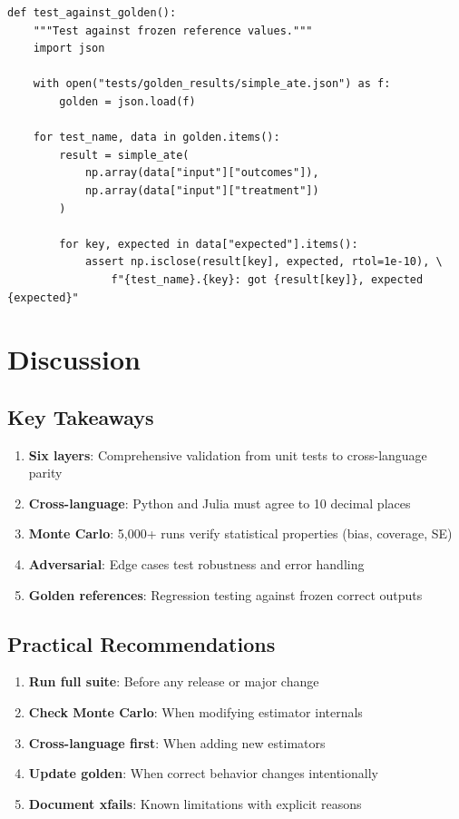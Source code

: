 \begin{verbatim}
def test_against_golden():
    """Test against frozen reference values."""
    import json

    with open("tests/golden_results/simple_ate.json") as f:
        golden = json.load(f)

    for test_name, data in golden.items():
        result = simple_ate(
            np.array(data["input"]["outcomes"]),
            np.array(data["input"]["treatment"])
        )

        for key, expected in data["expected"].items():
            assert np.isclose(result[key], expected, rtol=1e-10), \
                f"{test_name}.{key}: got {result[key]}, expected {expected}"
\end{verbatim}


\section{Discussion}

\subsection{Key Takeaways}

\begin{enumerate}
\item \textbf{Six layers}: Comprehensive validation from unit tests to cross-language parity
\item \textbf{Cross-language}: Python and Julia must agree to 10 decimal places
\item \textbf{Monte Carlo}: 5,000+ runs verify statistical properties (bias, coverage, SE)
\item \textbf{Adversarial}: Edge cases test robustness and error handling
\item \textbf{Golden references}: Regression testing against frozen correct outputs
\end{enumerate}

\subsection{Practical Recommendations}

\begin{enumerate}
\item \textbf{Run full suite}: Before any release or major change
\item \textbf{Check Monte Carlo}: When modifying estimator internals
\item \textbf{Cross-language first}: When adding new estimators
\item \textbf{Update golden}: When correct behavior changes intentionally
\item \textbf{Document xfails}: Known limitations with explicit reasons
\end{enumerate}

